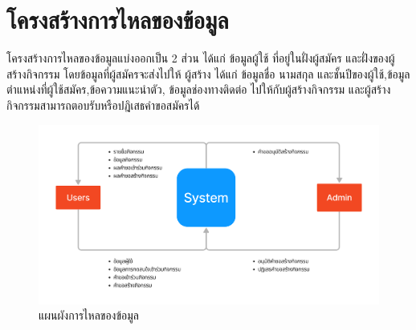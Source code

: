 \FloatBarrier

\section{โครงสร้างการไหลของข้อมูล}
โครงสร้างการไหลของข้อมูลแบ่งออกเป็น 2 ส่วน ได้แก่ ข้อมูลผู้ใช้ ที่อยู่ในฝั่งผู้สมัคร และฝั่งของผู้สร้างกิจกรรม
โดยข้อมูลที่ผู้สมัครจะส่งไปให้ ผู้สร้าง ได้แก่ ข้อมูลชื่อ นามสกุล และชั้นปีของผู้ใช้,ข้อมูลตำแหน่งที่ผู้ใช้สมัคร,ข้อความแนะนำตัว, ข้อมูลช่องทางติดต่อ 
ไปให้กับผู้สร้างกิจกรรม และผู้สร้างกิจกรรมสามารถตอบรับหรือปฎิเสธคำขอสมัครได้
\begin{figure}[h]
\begin{center}
\includegraphics[width=0.9\linewidth]{image/dataflow-diagram.png}
\end{center}
\caption{แผนผังการไหลของข้อมูล}
\label{fig:dataflow}
\end{figure}



